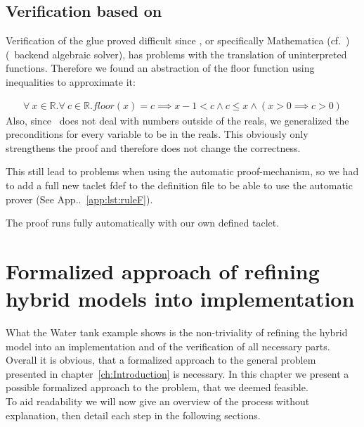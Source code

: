 \section{Verification based on \keym}
\label{sec:Watertank:Verification}

Verification of the glue proved difficult since \keym, or specifically Mathematica (cf.~\cite{mathematica}) (\keym~backend algebraic solver), has problems with the translation of uninterpreted functions. Therefore we found an abstraction of the floor function using inequalities to approximate it:

\begin{align*}
		\forall~x \in \mathbb{R}. \forall~c \in \mathbb{R}. floor(x) = c \implies x-1 < c \wedge c \leq x \wedge( x>0\implies c>0)
	\label{eq:approxF}
\end{align*}
Also, since \keym~does not deal with numbers outside of the reals, we generalized the preconditions for every variable to be in the reals. This obviously only strengthens the proof and therefore does not change the correctness.

This still lead to problems when using the automatic proof-mechanism, so we had to add a full new taclet fdef to the definition file to be able to use the automatic prover (See App..~\ref{app:lst:ruleF}).

The proof runs fully automatically with our own defined taclet.

\chapter{Formalized approach of refining hybrid models into implementation}
\label{ch:Process}

What the Water tank example shows is the non-triviality of refining the hybrid model into an implementation and of the verification of all necessary parts. Overall it is obvious, that a formalized approach to the general problem presented in chapter~\ref{ch:Introduction} is necessary. In this chapter we present a possible formalized approach to the problem, that we deemed feasible.
\\


To aid readability we will now give an overview of the process without explanation, then detail each step in the following sections. 

